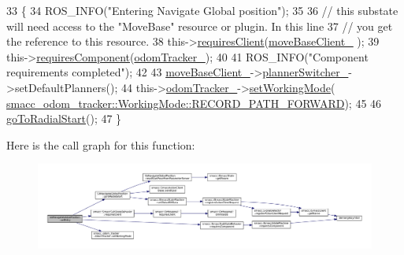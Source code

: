 \begin{DoxyCode}
33   \{
34     ROS\_INFO(\textcolor{stringliteral}{"Entering Navigate Global position"});
35 
36     \textcolor{comment}{// this substate will need access to the "MoveBase" resource or plugin. In this line}
37     \textcolor{comment}{// you get the reference to this resource.}
38     this->\hyperlink{classsmacc_1_1SmaccSubStateBehavior_ae8361a9e794b02f9f3d962b881e4fd7d}{requiresClient}(\hyperlink{classSbNavigateGlobalPosition_ad98d35df0281643268e2b00450b00af5}{moveBaseClient\_} );
39     this->\hyperlink{classsmacc_1_1SmaccSubStateBehavior_a9f31f62f886cc06017e92fa0d834b12d}{requiresComponent}(\hyperlink{classSbNavigateGlobalPosition_af7f17a2dabc667afa3a31c1205427ca6}{odomTracker\_});
40 
41     ROS\_INFO(\textcolor{stringliteral}{"Component requirements completed"});
42 
43     \hyperlink{classSbNavigateGlobalPosition_ad98d35df0281643268e2b00450b00af5}{moveBaseClient\_}->\hyperlink{classsmacc_1_1SmaccMoveBaseActionClient_ae24164268108abf0b35cf51bfba5ec67}{plannerSwitcher\_}->setDefaultPlanners();
44     this->\hyperlink{classSbNavigateGlobalPosition_af7f17a2dabc667afa3a31c1205427ca6}{odomTracker\_}->\hyperlink{classsmacc__odom__tracker_1_1OdomTracker_a38fbca999297c46dc95628cc60851a45}{setWorkingMode}(
      \hyperlink{namespacesmacc__odom__tracker_ade9730dd5cc10ccfad9362176cf46c33a989d06a586bcf9520889228da7faa643}{smacc\_odom\_tracker::WorkingMode::RECORD\_PATH\_FORWARD});
45 
46     \hyperlink{classSbNavigateGlobalPosition_a37b56e88ae4b01413c8fff19ee319769}{goToRadialStart}(); 
47   \}
\end{DoxyCode}


Here is the call graph for this function\+:
\nopagebreak
\begin{figure}[H]
\begin{center}
\leavevmode
\includegraphics[width=350pt]{classSbNavigateGlobalPosition_ae4c1f2e5de1077ee88d506eb69099f0c_cgraph}
\end{center}
\end{figure}


